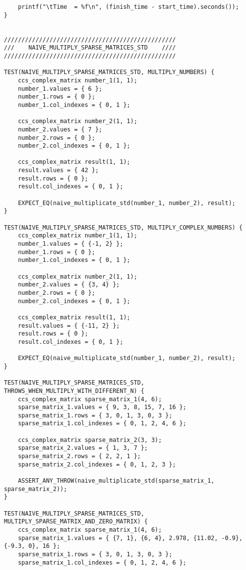 \documentclass{report}
\begin{document}
\begin{lstlisting}
    printf("\tTime  = %f\n", (finish_time - start_time).seconds());
}


/////////////////////////////////////////////////
///    NAIVE_MULTIPLY_SPARSE_MATRICES_STD    ////
/////////////////////////////////////////////////

TEST(NAIVE_MULTIPLY_SPARSE_MATRICES_STD, MULTIPLY_NUMBERS) {
    ccs_complex_matrix number_1(1, 1);
    number_1.values = { 6 };
    number_1.rows = { 0 };
    number_1.col_indexes = { 0, 1 };

    ccs_complex_matrix number_2(1, 1);
    number_2.values = { 7 };
    number_2.rows = { 0 };
    number_2.col_indexes = { 0, 1 };

    ccs_complex_matrix result(1, 1);
    result.values = { 42 };
    result.rows = { 0 };
    result.col_indexes = { 0, 1 };

    EXPECT_EQ(naive_multiplicate_std(number_1, number_2), result);
}

TEST(NAIVE_MULTIPLY_SPARSE_MATRICES_STD, MULTIPLY_COMPLEX_NUMBERS) {
    ccs_complex_matrix number_1(1, 1);
    number_1.values = { {-1, 2} };
    number_1.rows = { 0 };
    number_1.col_indexes = { 0, 1 };

    ccs_complex_matrix number_2(1, 1);
    number_2.values = { {3, 4} };
    number_2.rows = { 0 };
    number_2.col_indexes = { 0, 1 };

    ccs_complex_matrix result(1, 1);
    result.values = { {-11, 2} };
    result.rows = { 0 };
    result.col_indexes = { 0, 1 };

    EXPECT_EQ(naive_multiplicate_std(number_1, number_2), result);
}

TEST(NAIVE_MULTIPLY_SPARSE_MATRICES_STD, THROWS_WHEN_MULTIPLY_WITH_DIFFERENT_N) {
    ccs_complex_matrix sparse_matrix_1(4, 6);
    sparse_matrix_1.values = { 9, 3, 8, 15, 7, 16 };
    sparse_matrix_1.rows = { 3, 0, 1, 3, 0, 3 };
    sparse_matrix_1.col_indexes = { 0, 1, 2, 4, 6 };

    ccs_complex_matrix sparse_matrix_2(3, 3);
    sparse_matrix_2.values = { 1, 3, 7 };
    sparse_matrix_2.rows = { 2, 2, 1 };
    sparse_matrix_2.col_indexes = { 0, 1, 2, 3 };

    ASSERT_ANY_THROW(naive_multiplicate_std(sparse_matrix_1, sparse_matrix_2));
}

TEST(NAIVE_MULTIPLY_SPARSE_MATRICES_STD, MULTIPLY_SPARSE_MATRIX_AND_ZERO_MATRIX) {
    ccs_complex_matrix sparse_matrix_1(4, 6);
    sparse_matrix_1.values = { {7, 1}, {6, 4}, 2.978, {11.02, -0.9}, {-9.3, 0}, 16 };
    sparse_matrix_1.rows = { 3, 0, 1, 3, 0, 3 };
    sparse_matrix_1.col_indexes = { 0, 1, 2, 4, 6 };


\end{lstlisting}
\end{document}
